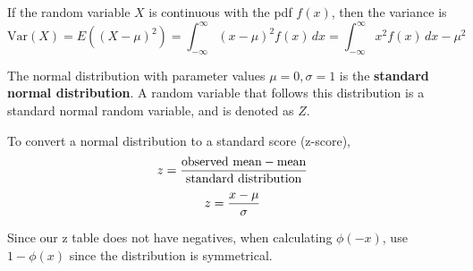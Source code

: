 \documentclass[english, 12pt]{article}
\begin{document}
\begin{defn}
If the random variable $X$ is continuous with the pdf $f(x)$, then the variance is
\[\text{Var}(X) = E((X-\mu)^2) = \int_{-\infty}^\infty (x-\mu)^2 f(x)\,dx = \int_{-\infty}^\infty x^2 f(x)\,dx - \mu^2\]
\end{defn}





\begin{defn}
The normal distribution with parameter values $\mu = 0, \sigma = 1$ is the \textbf{standard normal distribution}. A random variable that follows this distribution is a standard normal random variable, and is denoted as $Z$.
\end{defn}

To convert a normal distribution to a standard score (z-score),
\[z = \frac{\text{observed mean} - \text{mean}}{\text{standard distribution}}\]
\[z = \frac{x - \mu}{\sigma}\]


\begin{note}
Since our z table does not have negatives, when calculating $\phi(-x)$, use $1 - \phi(x)$ since the distribution is symmetrical.
\end{note}
\end{document}
